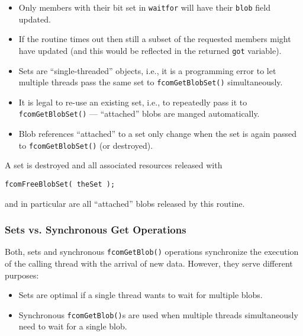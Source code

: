 \documentclass[11pt]{article}
\newcommand{\blob}{blob}
\newcommand{\Blob}{Blob}
\newcommand{\set}{set}
\newcommand{\Set}{Set}
\newcommand{\cstl}[1]{{\lstinline+#1+}}
\begin{document}
\begin{itemize}
              The application may ``take over'' a \blob{} reference by setting
              the \cstl{blob} field to NULL but it is then responsible for releasing
              the \blob.
\begin{verbatim}
FcomBlobRef my_blob  = theSet->memb[1].blob;
theSet->memb[1].blob = 0;
fcomFreeBlobSet( theSet ); /* member # 0 is released automatically */
fcomReleaseBlob( &my_blob );
\end{verbatim}
        \item Only members with their bit set in \cstl{waitfor} will have their
              \cstl{blob} field updated.
        \item If the routine times out then still a subset of the requested members
              might have updated (and this would be reflected in the returned \cstl{got}
              variable).
        \item \Set{}s are ``single-threaded'' objects, i.e., it is a programming error
              to let multiple threads pass the same \set{} to \cstl{fcomGetBlobSet()}
              simultaneously.
        \item It is legal to re-use an existing \set{}, i.e., to repeatedly pass it to
              \cstl{fcomGetBlobSet()} --- ``attached'' blobs are manged automatically.
        \item \Blob{} references ``attached'' to a \set{} only change when the \set{}
              is again passed to \cstl{fcomGetBlobSet()} (or destroyed).
      \end{itemize}

      A \set{} is destroyed and all associated resources released with
      \begin{verbatim}
fcomFreeBlobSet( theSet );
      \end{verbatim}
      and in particular are all ``attached'' \blob{}s released by this routine.

    \subsubsection{Sets vs. Synchronous Get Operations}
      Both, \set{}s and synchronous \cstl{fcomGetBlob()} operations synchronize
      the execution of the calling thread with the arrival of new data. However,
      they serve different purposes:
      \begin{itemize}
        \item \Set{}s are optimal if a single thread wants to wait for multiple \blob{}s.
        \item Synchronous \cstl{fcomGetBlob()}s are used when multiple threads simultaneously
              need to wait for a single \blob.
      \end{itemize}
\end{document}
